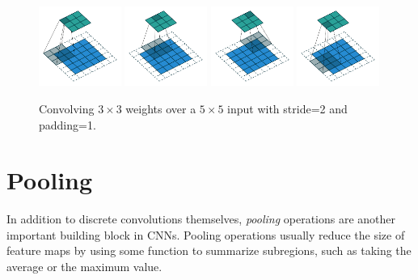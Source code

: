 \documentclass{article}
\begin{document}
\begin{figure}[H]
    \centering
    \includegraphics[width=0.24\textwidth]{pdf/padding_strides_00.pdf}
    \includegraphics[width=0.24\textwidth]{pdf/padding_strides_01.pdf}
    \includegraphics[width=0.24\textwidth]{pdf/padding_strides_02.pdf}
    \includegraphics[width=0.24\textwidth]{pdf/padding_strides_03.pdf}
    \caption{\label{fig:padding_strides} 
        Convolving $3 \times 3$ weights over a $5 \times 5$ input with stride=2 and padding=1.}
\end{figure}


\FloatBarrier
\newpage
\section{Pooling}

In addition to discrete convolutions themselves, {\em pooling\/} operations are another important building block in CNNs. 
Pooling operations usually reduce the size of feature maps by using some function to summarize subregions, such as taking the average or the maximum value.
\end{document}
